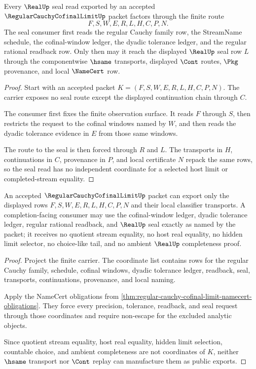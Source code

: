 \begin{theorem}
\label{thm:regular-cauchy-cofinal-limit-seal-factorization}
Every $\RealUp$ seal read exported by an accepted $\RegularCauchyCofinalLimitUp$ packet factors through the finite route
$$
F,S,W,E,R,L,H,C,P,N.
$$
The seal consumer first reads the regular Cauchy family row, the StreamName schedule, the cofinal-window ledger, the dyadic tolerance ledger, and the regular rational readback row. Only then may it reach the displayed $\RealUp$ seal row $L$ through the componentwise $\hsame$ transports, displayed $\Cont$ routes, $\Pkg$ provenance, and local $\NameCert$ row.
\end{theorem}
\begin{proof}
Start with an accepted packet $K=(F,S,W,E,R,L,H,C,P,N)$. The carrier exposes no seal route except the displayed continuation chain through $C$.

The consumer first fixes the finite observation surface. It reads $F$ through $S$, then restricts the request to the cofinal windows named by $W$, and then reads the dyadic tolerance evidence in $E$ from those same windows.

The route to the seal is then forced through $R$ and $L$. The transports in $H$, continuations in $C$, provenance in $P$, and local certificate $N$ repack the same rows, so the seal read has no independent coordinate for a selected host limit or completed-stream equality.
\end{proof}

\begin{theorem}
\label{thm:regular-cauchy-cofinal-limit-nonescape}
An accepted $\RegularCauchyCofinalLimitUp$ packet can export only the displayed rows $F,S,W,E,R,L,H,C,P,N$ and their local classifier transports. A completion-facing consumer may use the cofinal-window ledger, dyadic tolerance ledger, regular rational readback, and $\RealUp$ seal exactly as named by the packet; it receives no quotient stream equality, no host real equality, no hidden limit selector, no choice-like tail, and no ambient $\RealUp$ completeness proof.
\end{theorem}
\begin{proof}
Project the finite carrier. The coordinate list contains rows for the regular Cauchy family, schedule, cofinal windows, dyadic tolerance ledger, readback, seal, transports, continuations, provenance, and local naming.

Apply the NameCert obligations from \autoref{thm:regular-cauchy-cofinal-limit-namecert-obligations}. They force every precision, tolerance, readback, and seal request through those coordinates and require non-escape for the excluded analytic objects.

Since quotient stream equality, host real equality, hidden limit selection, countable choice, and ambient completeness are not coordinates of $K$, neither $\hsame$ transport nor $\Cont$ replay can manufacture them as public exports.
\end{proof}

